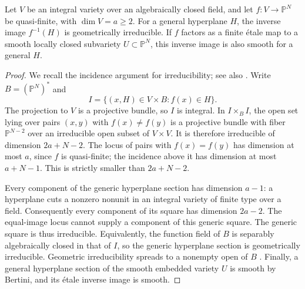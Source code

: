\begin{lemma}\label{tests:bertini}
Let $V$ be an integral variety over an algebraically closed field, and let
$f:V\to\mathbb P^N$ be quasi-finite, with $\dim V=a\ge2$.
For a general hyperplane $H$, the inverse image $f^{-1}(H)$ is
geometrically irreducible.  If $f$ factors as a finite \'etale map to a
smooth locally closed subvariety $U\subset\mathbb P^N$, this inverse image
is also smooth for a general $H$.
\end{lemma}

\begin{proof}
We recall the incidence argument for irreducibility; see also
\cite[Lemma~37.32.3, Tag~0G4F]{Stacks}.
Write $B=(\mathbb P^N)^*$ and
\[
 I=\{(x,H)\in V\times B:f(x)\in H\}.
\]
The projection to $V$ is a projective bundle, so $I$ is integral.
In $I\times_BI$, the open set lying over pairs $(x,y)$ with
$f(x)\ne f(y)$ is a projective bundle with fiber $\mathbb P^{N-2}$ over
an irreducible open subset of $V\times V$.  It is therefore irreducible
of dimension $2a+N-2$.
The locus of pairs with $f(x)=f(y)$ has dimension at most $a$, since $f$
is quasi-finite; the incidence above it has dimension at most $a+N-1$.
This is strictly smaller than $2a+N-2$.

Every component of the generic hyperplane section has dimension $a-1$:
a hyperplane cuts a nonzero nonunit in an integral variety of finite type
over a field.  Consequently every component of its square has dimension
$2a-2$.  The equal-image locus cannot supply a component of this generic
square.  The generic square is thus irreducible.  Equivalently, the
function field of $B$ is separably algebraically closed in that of $I$,
so the generic hyperplane section is geometrically irreducible.
Geometric irreducibility spreads to a nonempty open of $B$
\cite[Lemma~37.27.5, Tag~0559]{Stacks}.
Finally, a general hyperplane section of the smooth embedded variety $U$
is smooth by Bertini, and its \'etale inverse image is smooth.
\end{proof}

